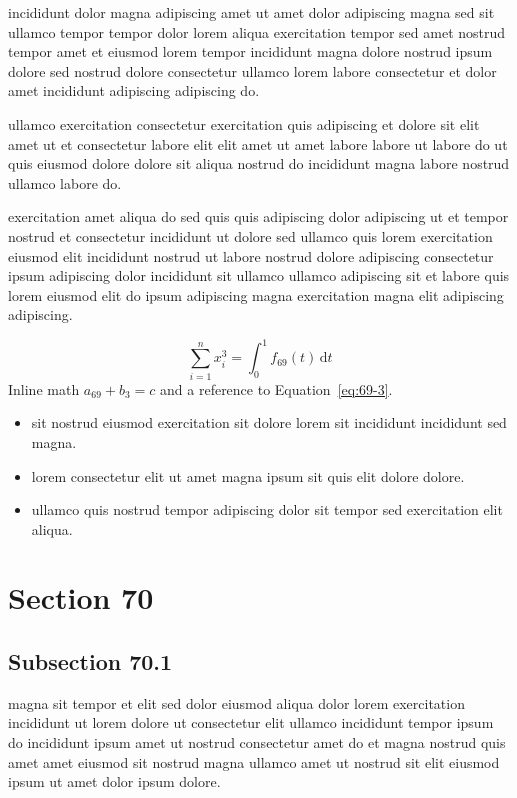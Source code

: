 \documentclass{article}
\begin{document}
incididunt dolor magna adipiscing amet ut amet dolor adipiscing magna sed sit ullamco tempor tempor dolor lorem aliqua exercitation tempor sed amet nostrud tempor amet et eiusmod lorem tempor incididunt magna dolore nostrud ipsum dolore sed nostrud dolore consectetur ullamco lorem labore consectetur et dolor amet incididunt adipiscing adipiscing do.

ullamco exercitation consectetur exercitation quis adipiscing et dolore sit elit amet ut et consectetur labore elit elit amet ut amet labore labore ut labore do ut quis eiusmod dolore dolore sit aliqua nostrud do incididunt magna labore nostrud ullamco labore do.

exercitation amet aliqua do sed quis quis adipiscing dolor adipiscing ut et tempor nostrud et consectetur incididunt ut dolore sed ullamco quis lorem exercitation eiusmod elit incididunt nostrud ut labore nostrud dolore adipiscing consectetur ipsum adipiscing dolor incididunt sit ullamco ullamco adipiscing sit et labore quis lorem eiusmod elit do ipsum adipiscing magna exercitation magna elit adipiscing adipiscing.

\begin{equation}\label{eq:69-3}
  \sum_{i=1}^{n} x_i^{3} = \int_0^1 f_{69}(t)\,\mathrm{d}t
\end{equation}
Inline math $a_{69} + b_{3} = c$ and a reference to Equation~\eqref{eq:69-3}.

\begin{itemize}
  \item sit nostrud eiusmod exercitation sit dolore lorem sit incididunt incididunt sed magna.
  \item lorem consectetur elit ut amet magna ipsum sit quis elit dolore dolore.
  \item ullamco quis nostrud tempor adipiscing dolor sit tempor sed exercitation elit aliqua.
\end{itemize}

\section{Section 70}\label{sec:70}
\subsection{Subsection 70.1}\label{sec:70-1}
magna sit tempor et elit sed dolor eiusmod aliqua dolor lorem exercitation incididunt ut lorem dolore ut consectetur elit ullamco incididunt tempor ipsum do incididunt ipsum amet ut nostrud consectetur amet do et magna nostrud quis amet amet eiusmod sit nostrud magna ullamco amet ut nostrud sit elit eiusmod ipsum ut amet dolor ipsum dolore.
\end{document}
